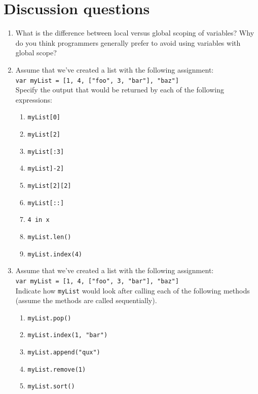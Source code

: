 \documentclass{book}
\begin{document}
\section{Discussion questions}
\begin{enumerate}
	\item What is the difference between local versus global scoping of variables? Why do you think programmers generally prefer to avoid using variables with global scope?
	\item Assume that we've created a list with the following assignment: \\ \texttt{var myList = [1, 4, ["foo", 3, "bar"], "baz"]}
	\\Specify the output that would be returned by each of the following expressions:
	\begin{enumerate}
		\item \texttt{myList[0]}
		\item \texttt{myList[2]}
		\item \texttt{myList[:3]}
		\item \texttt{myList]-2]}
		\item \texttt{myList[2][2]}
		\item \texttt{myList[::]}
		\item \texttt{4 in x}	
		\item \texttt{myList.len()}
		\item \texttt{myList.index(4)}
	\end{enumerate}
	\item Assume that we've created a list with the following assignment: \\ \texttt{var myList = [1, 4, ["foo", 3, "bar"], "baz"]}
	\\Indicate how \texttt{myList} would look after calling each of the following methods (assume the methods are called sequentially).
	\begin{enumerate}
		\item \texttt{myList.pop()}
		\item \texttt{myList.index(1, "bar")}
		\item \texttt{myList.append("qux")}
		\item \texttt{myList.remove(1)}
		\item \texttt{myList.sort()}
	\end{enumerate}
	
\end{enumerate}
\end{document}
